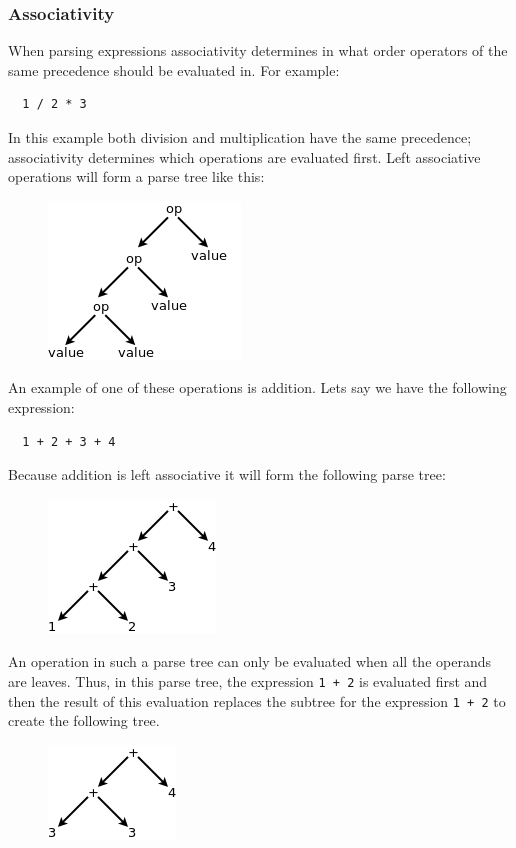 \documentclass{article}
\newcommand{\code}[1]{\texttt{\textmd{#1}}}
\begin{document}
\subsubsection{Associativity}
When parsing expressions associativity determines in what order operators of the same precedence
should be evaluated in. For example:
\begin{lstlisting}
  1 / 2 * 3
\end{lstlisting}

In this example both division and multiplication have the same precedence; associativity determines
which operations are evaluated first. Left associative operations will form a parse tree like this:
\begin{figure}[H]
  \centering
  \includegraphics{static/left-assoc-gen.png}
\end{figure}

An example of one of these operations is addition. Lets say we have the following expression:
\begin{lstlisting}
  1 + 2 + 3 + 4
\end{lstlisting}

Because addition is left associative it will form the following parse tree:
\begin{figure}[H]
  \centering
  \includegraphics{static/left-assoc-plus.png}
\end{figure}

An operation in such a parse tree can only be evaluated when all the operands are leaves. Thus, in
this parse tree, the expression \code{1 + 2} is evaluated first and then the result of this
evaluation replaces the subtree for the expression \code{1 + 2} to create the following tree.
\begin{figure}[H]
  \centering
  \includegraphics{static/left-assoc-plus-2.png}
\end{figure}
\end{document}
